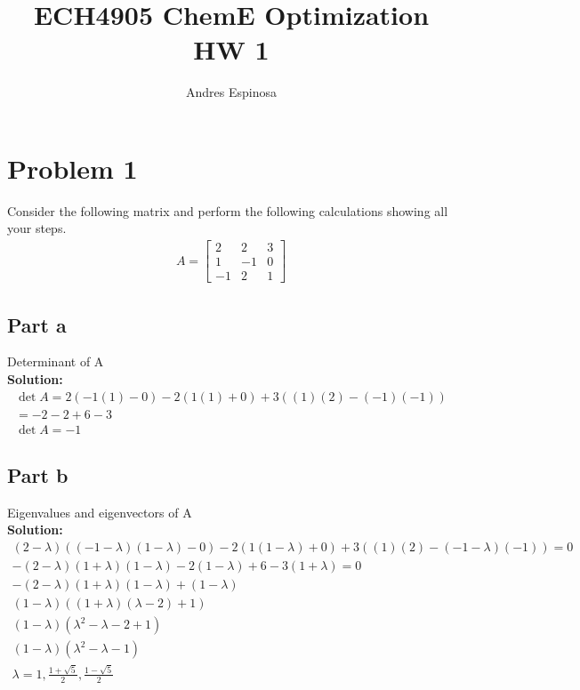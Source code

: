 \documentclass[11pt]{article}
\title{ECH4905 ChemE Optimization HW 1}
\author{Andres Espinosa}
\begin{document}
\maketitle

\section{Problem 1}
Consider the following matrix and perform the following calculations showing all your steps.
\begin{align*}
    A = 
  \begin{bmatrix}
     2 & 2 & 3 \\
     1 & -1 &0 \\
     -1 & 2 &1
  \end{bmatrix}
\end{align*}
\subsection{Part a}
Determinant of A
\\
\textbf{Solution: }
\begin{gather*}
    \det A = 
    2 (-1(1) - 0) - 2(1(1) + 0) + 3((1)(2) - (-1)(-1)) \\
    = -2 -2 + 6 - 3 \\
    \det A = -1
\end{gather*}

\subsection{Part b}
Eigenvalues and eigenvectors of A
\\
\textbf{Solution: }
\begin{gather*}
    (2- \lambda) ((-1 - \lambda)(1 - \lambda) - 0) - 2(1(1- \lambda) + 0) + 3((1)(2) - (-1-\lambda)(-1)) = 0 \\
    -(2-\lambda)(1+\lambda)(1-\lambda) -2(1-\lambda) + 6 -3(1+\lambda) = 0 \\
    -(2-\lambda)(1+\lambda)(1-\lambda) + (1-\lambda) \\
    (1-\lambda)((1+\lambda)(\lambda-2)+1) \\
    (1-\lambda)(\lambda^2 - \lambda -2 +1) \\
    (1-\lambda)(\lambda^2 - \lambda -1) \\
    \lambda = 1, \frac{1+\sqrt{5}}{2}, \frac{1 - \sqrt{5}}{2}
\end{gather*}

\end{document}
